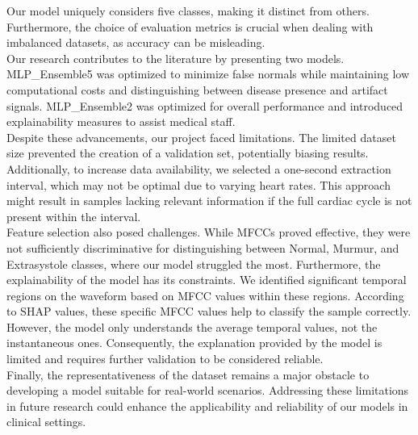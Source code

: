 Our model uniquely considers five classes, making it distinct from others. Furthermore, the choice of evaluation metrics is crucial when dealing
with imbalanced datasets, as accuracy can be misleading.\\
Our research contributes to the literature by presenting two models. MLP\_Ensemble5 was optimized to minimize
false normals while maintaining low computational costs and distinguishing between disease presence and artifact signals.
MLP\_Ensemble2 was optimized for overall performance and introduced explainability measures to assist medical staff.\\
Despite these advancements, our project faced limitations. The limited dataset size prevented the creation of a validation set, potentially biasing results.
Additionally, to increase data availability, we selected a one-second extraction interval, which may not be optimal due to varying heart rates.
This approach might result in samples lacking relevant information if the full cardiac cycle is not present within the interval.\\
Feature selection also posed challenges. While MFCCs proved effective, they were not sufficiently discriminative for distinguishing between Normal,
Murmur, and Extrasystole classes, where our model struggled the most. Furthermore, the explainability of the model has its constraints.
We identified significant temporal regions on the waveform based on MFCC values within these regions. 
According to SHAP values, these specific MFCC values help to classify the sample correctly.
 However, the model only understands the average temporal values, not the instantaneous ones. 
 Consequently, the explanation provided by the model is limited and requires further validation to be considered reliable.\\
Finally, the representativeness of the dataset remains a major obstacle to developing a model suitable for real-world scenarios.
Addressing these limitations in future research could enhance the applicability and reliability of our models in clinical settings.
